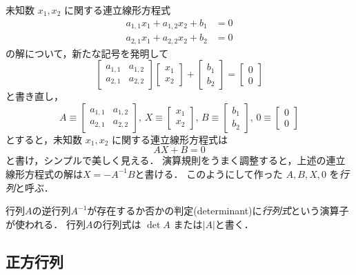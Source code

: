 \documentclass{jsbook}
\newcommand{\keyword}[1]{\emph{#1}}
\newcommand{\Zero}{0}%
\begin{document}
未知数 $x_1,x_2$ に関する連立線形方程式
\begin{align}
a_{1,1}x_1+a_{1,2}x_2+b_1&=0\\
a_{2,1}x_1+a_{2,2}x_2+b_2&=0
\end{align}
の解について，新たな記号を発明して
\begin{equation}
\begin{bmatrix}a_{1,1}&a_{1,2}\\a_{2,1}&a_{2,2}\end{bmatrix}\begin{bmatrix}x_1\\x_2\end{bmatrix}+\begin{bmatrix}b_1\\b_2\end{bmatrix}=\begin{bmatrix}0\\0\end{bmatrix}
\end{equation}
と書き直し，
\begin{equation}
A\equiv\begin{bmatrix}a_{1,1}&a_{1,2}\\a_{2,1}&a_{2,2}\end{bmatrix},\,
X\equiv\begin{bmatrix}x_1\\x_2\end{bmatrix},\,
B\equiv\begin{bmatrix}b_1\\b_2\end{bmatrix},\,
\Zero\equiv\begin{bmatrix}0\\0\end{bmatrix}
\end{equation}
とすると，未知数 $x_1,x_2$ に関する連立線形方程式は
\begin{equation}
AX+B=\Zero
\end{equation}
と書け，シンプルで美しく見える．
演算規則をうまく調整すると，上述の連立線形方程式の解は$X=-A^{-1}B$と書ける．
このようにして作った $A,B,X,\Zero$ を\keyword{行列}と呼ぶ．

行列$A$の逆行列$A^{-1}$が存在するか否かの判定(determinant)に\keyword{行列式}という演算子が使われる．
行列$A$の行列式は $\det A$ または$|A|$と書く．

\subsection{正方行列}
\end{document}
